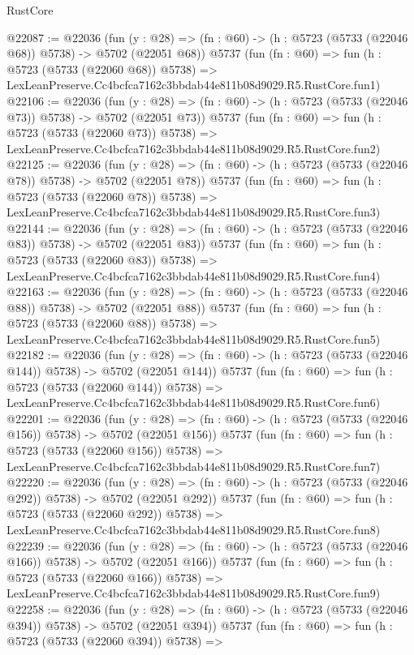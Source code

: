 \begin{lexlean}{RustCore}
\begin{coremodule}
@22087 := @22036
    (fun (y : @28) => (fn : @60) -> (h : @5723 (@5733 (@22046 @68)) @5738) -> @5702 (@22051 @68))
    @5737
    (fun (fn : @60) =>
    fun (h : @5723 (@5733 (@22060 @68)) @5738) =>
    LexLeanPreserve.Cc4bcfca7162c3bbdab44e811b08d9029.R5.RustCore.fun1)
@22106 := @22036
    (fun (y : @28) => (fn : @60) -> (h : @5723 (@5733 (@22046 @73)) @5738) -> @5702 (@22051 @73))
    @5737
    (fun (fn : @60) =>
    fun (h : @5723 (@5733 (@22060 @73)) @5738) =>
    LexLeanPreserve.Cc4bcfca7162c3bbdab44e811b08d9029.R5.RustCore.fun2)
@22125 := @22036
    (fun (y : @28) => (fn : @60) -> (h : @5723 (@5733 (@22046 @78)) @5738) -> @5702 (@22051 @78))
    @5737
    (fun (fn : @60) =>
    fun (h : @5723 (@5733 (@22060 @78)) @5738) =>
    LexLeanPreserve.Cc4bcfca7162c3bbdab44e811b08d9029.R5.RustCore.fun3)
@22144 := @22036
    (fun (y : @28) => (fn : @60) -> (h : @5723 (@5733 (@22046 @83)) @5738) -> @5702 (@22051 @83))
    @5737
    (fun (fn : @60) =>
    fun (h : @5723 (@5733 (@22060 @83)) @5738) =>
    LexLeanPreserve.Cc4bcfca7162c3bbdab44e811b08d9029.R5.RustCore.fun4)
@22163 := @22036
    (fun (y : @28) => (fn : @60) -> (h : @5723 (@5733 (@22046 @88)) @5738) -> @5702 (@22051 @88))
    @5737
    (fun (fn : @60) =>
    fun (h : @5723 (@5733 (@22060 @88)) @5738) =>
    LexLeanPreserve.Cc4bcfca7162c3bbdab44e811b08d9029.R5.RustCore.fun5)
@22182 := @22036
    (fun (y : @28) => (fn : @60) -> (h : @5723 (@5733 (@22046 @144)) @5738) -> @5702 (@22051 @144))
    @5737
    (fun (fn : @60) =>
    fun (h : @5723 (@5733 (@22060 @144)) @5738) =>
    LexLeanPreserve.Cc4bcfca7162c3bbdab44e811b08d9029.R5.RustCore.fun6)
@22201 := @22036
    (fun (y : @28) => (fn : @60) -> (h : @5723 (@5733 (@22046 @156)) @5738) -> @5702 (@22051 @156))
    @5737
    (fun (fn : @60) =>
    fun (h : @5723 (@5733 (@22060 @156)) @5738) =>
    LexLeanPreserve.Cc4bcfca7162c3bbdab44e811b08d9029.R5.RustCore.fun7)
@22220 := @22036
    (fun (y : @28) => (fn : @60) -> (h : @5723 (@5733 (@22046 @292)) @5738) -> @5702 (@22051 @292))
    @5737
    (fun (fn : @60) =>
    fun (h : @5723 (@5733 (@22060 @292)) @5738) =>
    LexLeanPreserve.Cc4bcfca7162c3bbdab44e811b08d9029.R5.RustCore.fun8)
@22239 := @22036
    (fun (y : @28) => (fn : @60) -> (h : @5723 (@5733 (@22046 @166)) @5738) -> @5702 (@22051 @166))
    @5737
    (fun (fn : @60) =>
    fun (h : @5723 (@5733 (@22060 @166)) @5738) =>
    LexLeanPreserve.Cc4bcfca7162c3bbdab44e811b08d9029.R5.RustCore.fun9)
@22258 := @22036
    (fun (y : @28) => (fn : @60) -> (h : @5723 (@5733 (@22046 @394)) @5738) -> @5702 (@22051 @394))
    @5737
    (fun (fn : @60) =>
    fun (h : @5723 (@5733 (@22060 @394)) @5738) =>

\end{coremodule}
\end{lexlean}
